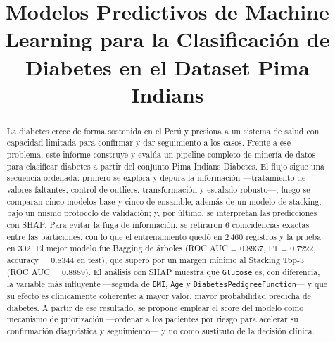 \documentclass[conference]{IEEEtran}
\newcommand{\code}[1]{\texttt{#1}}
\begin{document}
\title{Modelos Predictivos de Machine Learning para la Clasificación de Diabetes en el Dataset Pima Indians}

\author{
\and
{}
\and
{}
}
\maketitle

\begin{abstract}
La diabetes crece de forma sostenida en el Perú y presiona a un sistema de salud con capacidad limitada para confirmar y dar seguimiento a los casos. Frente a ese problema, este informe construye y evalúa un pipeline completo de minería de datos para clasificar diabetes a partir del conjunto Pima Indians Diabetes. El flujo sigue una secuencia ordenada: primero se explora y depura la información ---tratamiento de valores faltantes, control de outliers, transformación y escalado robusto---; luego se comparan cinco modelos base y cinco de ensamble, además de un modelo de stacking, bajo un mismo protocolo de validación; y, por último, se interpretan las predicciones con SHAP. Para evitar la fuga de información, se retiraron 6 coincidencias exactas entre las particiones, con lo que el entrenamiento quedó en 2\,460 registros y la prueba en 302. El mejor modelo fue Bagging de árboles (ROC AUC = 0.8937, F1 = 0.7222, accuracy = 0.8344 en test), que superó por un margen mínimo al Stacking Top-3 (ROC AUC = 0.8889). El análisis con SHAP muestra que \code{Glucose} es, con diferencia, la variable más influyente ---seguida de \code{BMI}, \code{Age} y \code{DiabetesPedigreeFunction}--- y que su efecto es clínicamente coherente: a mayor valor, mayor probabilidad predicha de diabetes. A partir de ese resultado, se propone emplear el score del modelo como mecanismo de priorización ---ordenar a los pacientes por riesgo para acelerar su confirmación diagnóstica y seguimiento--- y no como sustituto de la decisión clínica.
\end{abstract}
\end{document}
